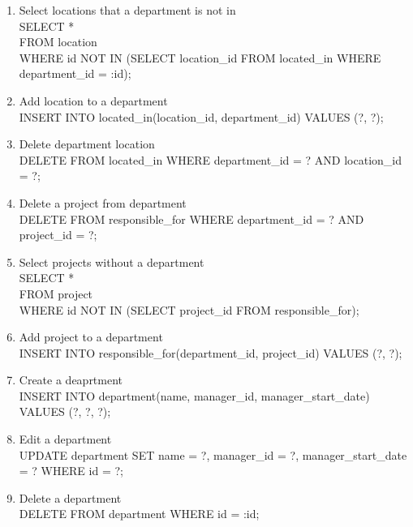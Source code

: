 \documentclass[fleqn, 11pt,letterpaper]{article}
\begin{document}
\begin{enumerate}
		\item Select locations that a department is not in\\SELECT * \\FROM location \\WHERE id NOT IN (SELECT location\_id FROM located\_in WHERE department\_id = :id);
		\item Add location to a department \\INSERT INTO located\_in(location\_id, department\_id) VALUES (?, ?);
		\item Delete department location \\DELETE FROM located\_in WHERE department\_id = ? AND location\_id = ?; 
		\item Delete a project from department \\DELETE FROM responsible\_for WHERE department\_id = ? AND project\_id = ?;
		\item Select projects without a department \\SELECT * \\FROM project \\WHERE id NOT IN (SELECT project\_id FROM responsible\_for);
		\item Add project to a department\\INSERT INTO responsible\_for(department\_id, project\_id) VALUES (?, ?);
		\item Create a deaprtment\\INSERT INTO department(name, manager\_id, manager\_start\_date) VALUES (?, ?, ?);
		\item Edit a department \\UPDATE department SET name = ?, manager\_id = ?, manager\_start\_date = ? WHERE id = ?;
		\item Delete a department \\DELETE FROM department WHERE id = :id;
	\end{enumerate}
\end{document}
